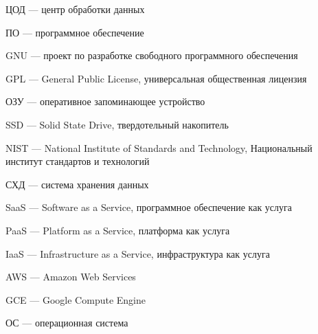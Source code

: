 
ЦОД --- центр обработки данных

ПО --- программное обеспечение

GNU --- проект по разработке свободного программного обеспечения

GPL --- General Public License, универсальная общественная лицензия

ОЗУ --- оперативное запоминающее устройство

SSD --- Solid State Drive, твердотельный накопитель

NIST --- National Institute of Standards and Technology, Национальный институт стандартов и технологий

СХД --- система хранения данных

SaaS --- Software as a Service, программное обеспечение как услуга

PaaS --- Platform as a Service, платформа как услуга

IaaS --- Infrastructure as a Service, инфраструктура как услуга

AWS --- Amazon Web Services

GCE --- Google Compute Engine

ОС --- операционная система

\clearpage
